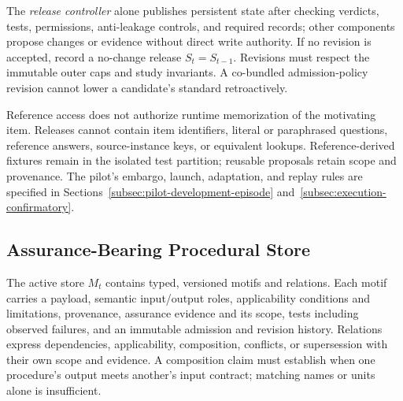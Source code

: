 \documentclass[10pt]{article} %
\providecommand{\1}{\mathbf{1}}  %
\theoremstyle{remark}
\theoremstyle{definition}
\begin{document}
The \emph{release controller} alone publishes persistent state after
checking verdicts, tests, permissions, anti-leakage controls, and required
records; other components propose changes or evidence without direct
write authority. If no revision is accepted, record a no-change release
$S_t=S_{t-1}$. Revisions must respect the immutable outer caps and study
invariants. A co-bundled admission-policy revision cannot lower a
candidate's standard retroactively.

Reference access does not authorize runtime memorization of the
motivating item. Releases cannot contain item identifiers, literal or
paraphrased questions, reference answers, source-instance keys, or
equivalent lookups. Reference-derived fixtures remain in the isolated
test partition; reusable proposals retain scope and provenance.
The pilot's embargo, launch, adaptation, and replay rules are specified in
Sections~\ref{subsec:pilot-development-episode}
and~\ref{subsec:execution-confirmatory}.

\subsection{Assurance-Bearing Procedural Store}
\label{subsec:courtroom-store}

The active store $M_t$ contains typed, versioned motifs and relations.
Each motif carries a payload, semantic input/output roles, applicability
conditions and limitations, provenance, assurance evidence and its scope,
tests including observed failures, and an immutable admission and
revision history. Relations express dependencies, applicability,
composition, conflicts, or supersession with their own scope and
evidence. A composition claim must establish when one procedure's output
meets another's input contract; matching names or units alone is
insufficient.
\end{document}
